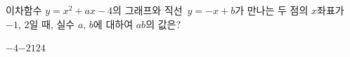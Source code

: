 이차함수 $y=x^2+ax-4$의 그래프와 직선~$y=-x+b$가 만나는 두 점의 $x$좌표가 $-1$, $2$일 때, 실수 $a$, $b$에 대하여 $ab$의 값은?
\begin{choices32}{$-4$}{$-2$}{$1$}{$2$}{$4$}\end{choices32}
